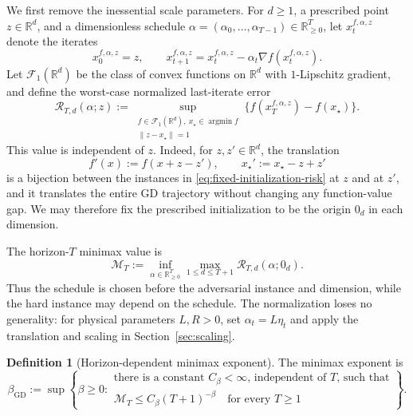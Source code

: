 \documentclass[11pt]{article}
\theoremstyle{definition}
\newtheorem{definition}[theorem]{Definition}
\theoremstyle{remark}
\newcommand{\R}{\mathbb{R}}
\newcommand{\smoothclass}{\mathcal{F}}
\newcommand{\gdexp}{\beta_{\mathrm{GD}}}
\newcommand{\argmin}{\operatorname*{argmin}}
\begin{document}
We first remove the inessential scale parameters.  For \(d\ge1\), a
prescribed point \(z\in\R^d\), and a dimensionless schedule
\(\alpha=(\alpha_0,\ldots,\alpha_{T-1})\in\R_{\ge0}^T\), let
\(x_t^{f,\alpha,z}\) denote the
iterates
\[
 x_0^{f,\alpha,z}=z,\qquad
 x_{t+1}^{f,\alpha,z}
 =x_t^{f,\alpha,z}-\alpha_t\nabla f(x_t^{f,\alpha,z}).
\]
Let \(\smoothclass_1(\R^d)\) be the class of convex functions on \(\R^d\)
with
\(1\)-Lipschitz gradient, and define the worst-case normalized last-iterate
error
\begin{equation}
 \mathcal R_{T,d}(\alpha;z)
 :=
 \sup_{\substack{
       f\in\smoothclass_1(\R^d),\ x_\star\in\argmin f\\
       \|z-x_\star\|=1}}
 \bigl\{f(x_T^{f,\alpha,z})-f(x_\star)\bigr\}.
 \label{eq:fixed-initialization-risk}
\end{equation}
This value is independent of \(z\).  Indeed, for \(z,z'\in\R^d\), the
translation
\[
 f'(x):=f(x+z-z'),
 \qquad
 x_\star':=x_\star-z+z'
\]
is a bijection between the instances in
\eqref{eq:fixed-initialization-risk} at \(z\) and at \(z'\), and it
translates the entire GD trajectory without changing any function-value
gap.  We may therefore fix the prescribed initialization to be the origin
\(0_d\) in each dimension.

The horizon-\(T\) minimax value is
\begin{equation}
 \mathcal M_T
 :=
 \inf_{\alpha\in\R_{\ge0}^T}
 \max_{1\le d\le T+1}
 \mathcal R_{T,d}(\alpha;0_d).
 \label{eq:minimax-value}
\end{equation}
Thus the schedule is chosen before the adversarial instance and dimension,
while the hard instance may depend on the schedule.  The normalization loses
no generality: for physical parameters \(L,R>0\), set
\(\alpha_t=L\eta_t\) and
apply the translation and scaling in Section~\ref{sec:scaling}.

\begin{definition}[Horizon-dependent minimax exponent]
\label{def:minimax-exponent}
The minimax exponent is
\begin{equation}
 \gdexp
 :=
 \sup\left\{
 \beta\ge0:
 \begin{array}{l}
 \text{there is a constant \(C_\beta<\infty\), independent of \(T\), such that}\\[-1mm]
 \mathcal M_T\le C_\beta(T+1)^{-\beta}\quad\text{for every \(T\ge1\)}
 \end{array}
 \right\}.
 \label{eq:minimax-exponent}
\end{equation}
\end{definition}
\end{document}
